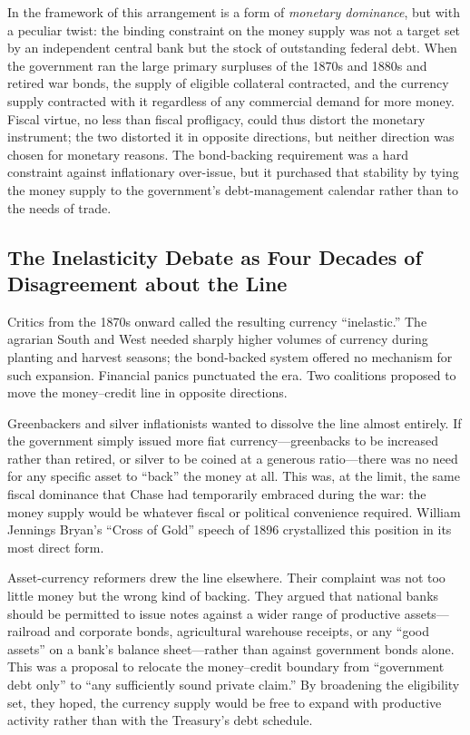 \documentclass[12pt]{article}
\begin{document}
In the framework of \citet{Sargent2011} this arrangement is a form of
\emph{monetary dominance}, but with a peculiar twist: the binding
constraint on the money supply was not a target set by an independent
central bank but the stock of outstanding federal debt.  When the
government ran the large primary surpluses of the 1870s and 1880s and
retired war bonds, the supply of eligible collateral contracted, and
the currency supply contracted with it regardless of any commercial
demand for more money.  Fiscal virtue, no less than fiscal profligacy,
could thus distort the monetary instrument; the two distorted it in
opposite directions, but neither direction was chosen for monetary
reasons.  The bond-backing requirement was a hard constraint against
inflationary over-issue, but it purchased that stability by tying the
money supply to the government's debt-management calendar rather than
to the needs of trade.

\subsection{The Inelasticity Debate as Four Decades of Disagreement
            about the Line}

Critics from the 1870s onward called the resulting currency
``inelastic.''  The agrarian South and West needed sharply higher
volumes of currency during planting and harvest seasons; the bond-backed
system offered no mechanism for such expansion.  Financial panics
punctuated the era.  Two coalitions proposed to move the
money--credit line in opposite directions.

Greenbackers and silver inflationists wanted to dissolve the
line almost entirely.  If the government simply issued more fiat
currency---greenbacks to be increased rather than retired, or silver to
be coined at a generous ratio---there was no need for any specific asset
to ``back'' the money at all.  This was, at the limit, the same fiscal
dominance that Chase had temporarily embraced during the war: the money
supply would be whatever fiscal or political convenience required.
William Jennings Bryan's ``Cross of Gold'' speech of 1896 crystallized
this position in its most direct form.

Asset-currency reformers drew the line elsewhere.  Their complaint was
not too little money but the wrong kind of backing.  They argued that
national banks should be permitted to issue notes against a wider range
of productive assets---railroad and corporate bonds, agricultural
warehouse receipts, or any ``good assets'' on a bank's balance
sheet---rather than against government bonds alone.  This was a proposal
to relocate the money--credit boundary from ``government debt only'' to
``any sufficiently sound private claim.''  By broadening the eligibility
set, they hoped, the currency supply would be free to expand with
productive activity rather than with the Treasury's debt schedule.
\end{document}
